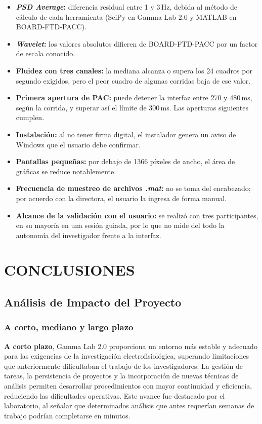 \documentclass[12pt,letterpaper,oneside]{article}
\newcommand{\capitulo}[1]{\clearpage\section{#1}}
\begin{document}
\begin{itemize}
  \item \textbf{\textit{PSD Average}:} diferencia residual entre 1 y 3\,Hz, debida al método de cálculo de cada herramienta (SciPy en Gamma Lab 2.0 y MATLAB en BOARD-FTD-PACC).
  \item \textbf{\textit{Wavelet}:} los valores absolutos difieren de BOARD-FTD-PACC por un factor de escala conocido.
  \item \textbf{Fluidez con tres canales:} la mediana alcanza o supera los 24 cuadros por segundo exigidos, pero el peor cuadro de algunas corridas baja de ese valor.
  \item \textbf{Primera apertura de PAC:} puede detener la interfaz entre 270 y 480\,ms, según la corrida, y superar así el límite de 300\,ms. Las aperturas siguientes cumplen.
  \item \textbf{Instalación:} al no tener firma digital, el instalador genera un aviso de Windows que el usuario debe confirmar.
  \item \textbf{Pantallas pequeñas:} por debajo de 1366 píxeles de ancho, el área de gráficas se reduce notablemente.
  \item \textbf{Frecuencia de muestreo de archivos \textit{.mat}:} no se toma del encabezado; por acuerdo con la directora, el usuario la ingresa de forma manual.
  \item \textbf{Alcance de la validación con el usuario:} se realizó con tres participantes, en su mayoría en una sesión guiada, por lo que no mide del todo la autonomía del investigador frente a la interfaz.
\end{itemize}

\capitulo{CONCLUSIONES}

\subsection{Análisis de Impacto del Proyecto}

\subsubsection{A corto, mediano y largo plazo}

\textbf{A corto plazo}, Gamma Lab 2.0 proporciona un entorno más estable y adecuado para las exigencias de la investigación electrofisiológica, superando limitaciones que anteriormente dificultaban el trabajo de los investigadores. La gestión de tareas, la persistencia de proyectos y la incorporación de nuevas técnicas de análisis permiten desarrollar procedimientos con mayor continuidad y eficiencia, reduciendo las dificultades operativas. Este avance fue destacado por el laboratorio, al señalar que determinados análisis que antes requerían semanas de trabajo podrían completarse en minutos.
\end{document}

